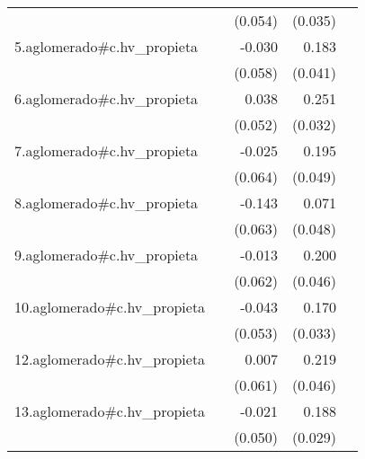 {\begin{longtable}{l*{4}{D{.}{.}{-1}}}
            &                     &     (0.054)         &     (0.035)         &                     \\
\addlinespace
5.aglomerado#c.hv\_propieta&                     &      -0.030         &       0.183\sym{***}&                     \\
            &                     &     (0.058)         &     (0.041)         &                     \\
\addlinespace
6.aglomerado#c.hv\_propieta&                     &       0.038         &       0.251\sym{***}&                     \\
            &                     &     (0.052)         &     (0.032)         &                     \\
\addlinespace
7.aglomerado#c.hv\_propieta&                     &      -0.025         &       0.195\sym{***}&                     \\
            &                     &     (0.064)         &     (0.049)         &                     \\
\addlinespace
8.aglomerado#c.hv\_propieta&                     &      -0.143\sym{*}  &       0.071         &                     \\
            &                     &     (0.063)         &     (0.048)         &                     \\
\addlinespace
9.aglomerado#c.hv\_propieta&                     &      -0.013         &       0.200\sym{***}&                     \\
            &                     &     (0.062)         &     (0.046)         &                     \\
\addlinespace
10.aglomerado#c.hv\_propieta&                     &      -0.043         &       0.170\sym{***}&                     \\
            &                     &     (0.053)         &     (0.033)         &                     \\
\addlinespace
12.aglomerado#c.hv\_propieta&                     &       0.007         &       0.219\sym{***}&                     \\
            &                     &     (0.061)         &     (0.046)         &                     \\
\addlinespace
13.aglomerado#c.hv\_propieta&                     &      -0.021         &       0.188\sym{***}&                     \\
            &                     &     (0.050)         &     (0.029)         &                     \\

\end{longtable}}
